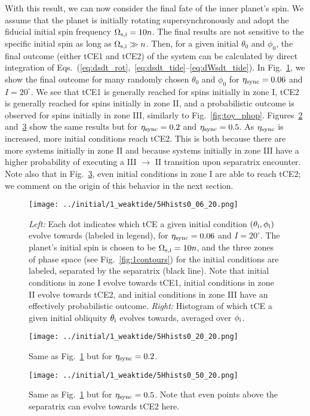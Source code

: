 \documentclass[
        fleqn,
        usenatbib,
    ]{mnras}
\begin{document}
With this result, we can now consider the final fate of the inner planet's spin.
We assume that the planet is initially rotating supersynchronously and adopt the
fiducial initial spin frequency $\Omega_{\rm s, i} = 10n$. The final results are
not sensitive to the specific initial spin as long as $\Omega_{\rm s, i} \gg n$.
Then, for a given initial $\theta_0$ and $\phi_0$, the final outcome (either
tCE1 and tCE2) of the system can be calculated by direct integration of
Eqs.~(\ref{eq:dsdt_rot},~\ref{eq:dsdt_tide}--\ref{eq:dWsdt_tide}). In
Fig.~\ref{fig:Hhists_0_06}, we show the final outcome for many randomly chosen
$\theta_0$ and $\phi_0$ for $\eta_{\rm sync} = 0.06$ and $I = 20^\circ$. We see
that tCE1 is generally reached for spins initially in zone I, tCE2 is generally
reached for spins initially in zone II, and a probabilistic outcome is observed
for spins initially in zone III, similarly to Fig.~\ref{fig:toy_phop}.
Figures~\ref{fig:Hhists_0_20} and~\ref{fig:Hhists_0_70} show the same results
but for $\eta_{\rm sync} = 0.2$ and $\eta_{\rm sync} = 0.5$. As $\eta_{\rm
sync}$ is increased, more initial conditions reach tCE2. This is both because
there are more systems initially in zone II and because systems initially
in zone III have a higher probability of executing a III $\to$ II transition
upon separatrix encounter. Note also that in Fig.~\ref{fig:Hhists_0_70}, even
initial conditions in zone I are able to reach tCE2; we comment on the origin of
this behavior in the next section.
\begin{figure}
    \centering
    \texttt{[image: ../initial/1\_weaktide/5Hhists0\_06\_20.png]}
    \caption{\emph{Left:} Each dot indicates which tCE a given initial condition
    $(\theta_{\rm i}, \phi_{\rm i})$ evolve towards (labeled in legend), for
    $\eta_{\rm sync} = 0.06$ and $I = 20^\circ$. The planet's initial spin is
    chosen to be $\Omega_{\rm s, i} = 10n$, and the three zones of phase space
    (see Fig.~\ref{fig:1contours}) for the initial conditions are labeled,
    separated by the separatrix (black line). Note that initial conditions in
    zone I evolve towards tCE1, initial conditions in zone II evolve towards
    tCE2, and initial conditions in zone III have an effectively probabilistic
    outcome. \emph{Right:} Histogram of which tCE a given initial obliquity
    $\theta_{\rm i}$ evolves towards, averaged over $\phi_{\rm
    i}$.}\label{fig:Hhists_0_06}
\end{figure}
\begin{figure}
    \centering
    \texttt{[image: ../initial/1\_weaktide/5Hhists0\_20\_20.png]}
    \caption{Same as Fig.~\ref{fig:Hhists_0_06} but for $\eta_{\rm sync} =
    0.2$.}\label{fig:Hhists_0_20}
\end{figure}
\begin{figure}
    \centering
    \texttt{[image: ../initial/1\_weaktide/5Hhists0\_50\_20.png]}
    \caption{Same as Fig.~\ref{fig:Hhists_0_06} but for $\eta_{\rm sync} =
    0.5$. Note that even points above the separatrix can evolve towards tCE2
    here.}\label{fig:Hhists_0_70}
\end{figure}
\end{document}
